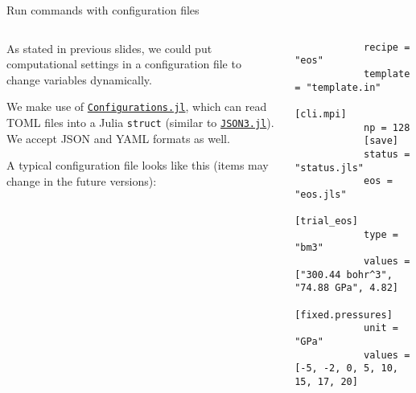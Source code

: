 \begin{frame}{Run commands with configuration files}

    \begin{columns}[t]
        \begin{column}{0.4\textwidth}
            As stated in previous slides, we could put computational settings
            in a configuration file to change variables dynamically.

            We make use of
            \href{https://github.com/Roger-luo/Configurations.jl}{\texttt{Configurations.jl}},
            which can read TOML files into a Julia \texttt{struct}
            (similar to \href{https://github.com/quinnj/JSON3.jl}{\texttt{JSON3.jl}}).
            We accept JSON and YAML formats as well.

            A typical configuration file looks like this (items may change in the future versions):
        \end{column}

        \begin{column}{0.6\textwidth}
            \begin{verbatim}
            recipe = "eos"
            template = "template.in"
            [cli.mpi]
            np = 128
            [save]
            status = "status.jls"
            eos = "eos.jls"
            [trial_eos]
            type = "bm3"
            values = ["300.44 bohr^3", "74.88 GPa", 4.82]
            [fixed.pressures]
            unit = "GPa"
            values = [-5, -2, 0, 5, 10, 15, 17, 20]
        \end{verbatim}
        \end{column}
    \end{columns}

\end{frame}
